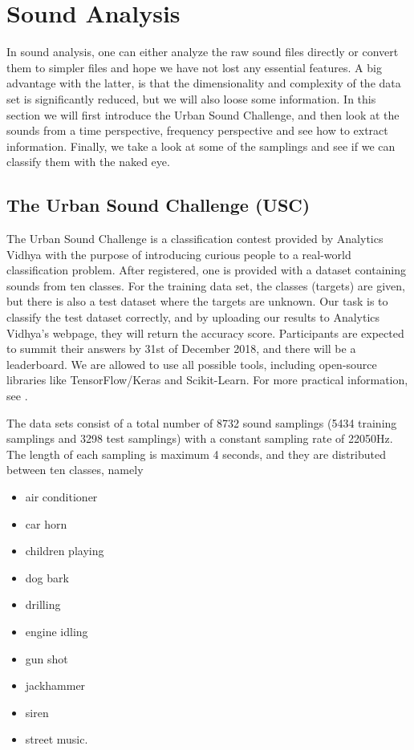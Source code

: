 \section{Sound Analysis} \label{sec:theory}
In sound analysis, one can either analyze the raw sound files directly or convert them to simpler files and hope we have not lost any essential features. A big advantage with the latter, is that the dimensionality and complexity of the data set is significantly reduced, but we will also loose some information. In this section we will first introduce the Urban Sound Challenge, and then look at the sounds from a time perspective, frequency perspective and see how to extract information. Finally, we take a look at some of the samplings and see if we can classify them with the naked eye.

\subsection{The Urban Sound Challenge (USC)}
The Urban Sound Challenge is a classification contest provided by Analytics Vidhya with the purpose of introducing curious people to a real-world classification problem. After registered, one is provided with a dataset containing sounds from ten classes. For the training data set, the classes (targets) are given, but there is also a test dataset where the targets are unknown. Our task is to classify the test dataset correctly, and by uploading our results to Analytics Vidhya's webpage, they will return the accuracy score. Participants are expected to summit their answers by 31st of December 2018, and there will be a leaderboard. We are allowed to use all possible tools, including open-source libraries like TensorFlow/Keras and Scikit-Learn. For more practical information, see \cite{USC}.

The data sets consist of a total number of 8732 sound samplings (5434 training samplings and 3298 test samplings) with a constant sampling rate of 22050Hz. The length of each sampling is maximum 4 seconds, and they are distributed between ten classes, namely
\begin{multicols}{2}
	\begin{itemize}
		\setlength\itemsep{0.2em}
		\item air conditioner
		\item car horn
		\item children playing
		\item dog bark
		\item drilling
	\end{itemize}
	
	\columnbreak
	
	\begin{itemize}
		\setlength\itemsep{0.2em}
		\item engine idling
		\item gun shot
		\item jackhammer
		\item siren
		\item street music.
	\end{itemize}
\end{multicols}

